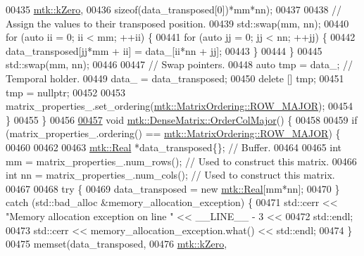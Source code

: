 \begin{DoxyCode}
00435           \hyperlink{group__c01-roots_ga59a451a5fae30d59649bcda274fea271}{mtk::kZero},
00436           \textcolor{keyword}{sizeof}(data\_transposed[0])*mm*nn);
00437 
00438     \textcolor{comment}{// Assign the values to their transposed position.}
00439     std::swap(mm, nn);
00440     \textcolor{keywordflow}{for} (\textcolor{keyword}{auto} ii = 0; ii < mm; ++ii) \{
00441       \textcolor{keywordflow}{for} (\textcolor{keyword}{auto} jj = 0; jj < nn; ++jj) \{
00442         data\_transposed[jj*mm + ii] = data\_[ii*nn + jj];
00443       \}
00444     \}
00445     std::swap(mm, nn);
00446 
00447     \textcolor{comment}{// Swap pointers.}
00448     \textcolor{keyword}{auto} tmp = data\_; \textcolor{comment}{// Temporal holder.}
00449     data\_ = data\_transposed;
00450     \textcolor{keyword}{delete} [] tmp;
00451     tmp = \textcolor{keyword}{nullptr};
00452 
00453     matrix\_properties\_.set\_ordering(\hyperlink{namespacemtk_ga622801bd9f912d0f976c3e383f5f581ca21541962976d7709c26e9cd8385bd648}{mtk::MatrixOrdering::ROW\_MAJOR});
00454   \}
00455 \}
00456 
\hypertarget{mtk__dense__matrix_8cc_source_l00457}{}\hyperlink{classmtk_1_1DenseMatrix_a59b9bea24acf39dca64e8549b3527463}{00457} \textcolor{keywordtype}{void} \hyperlink{classmtk_1_1DenseMatrix_a59b9bea24acf39dca64e8549b3527463}{mtk::DenseMatrix::OrderColMajor}() \{
00458 
00459   \textcolor{keywordflow}{if} (matrix\_properties\_.ordering() == \hyperlink{namespacemtk_ga622801bd9f912d0f976c3e383f5f581ca21541962976d7709c26e9cd8385bd648}{mtk::MatrixOrdering::ROW\_MAJOR}) \{
00460 
00462 
00463     \hyperlink{group__c01-roots_gac080bbbf5cbb5502c9f00405f894857d}{mtk::Real} *data\_transposed\{\}; \textcolor{comment}{// Buffer.}
00464 
00465     \textcolor{keywordtype}{int} mm = matrix\_properties\_.num\_rows(); \textcolor{comment}{// Used to construct this matrix.}
00466     \textcolor{keywordtype}{int} nn = matrix\_properties\_.num\_cols(); \textcolor{comment}{// Used to construct this matrix.}
00467 
00468     \textcolor{keywordflow}{try} \{
00469       data\_transposed = \textcolor{keyword}{new} \hyperlink{group__c01-roots_gac080bbbf5cbb5502c9f00405f894857d}{mtk::Real}[mm*nn];
00470     \} \textcolor{keywordflow}{catch} (std::bad\_alloc &memory\_allocation\_exception) \{
00471       std::cerr << \textcolor{stringliteral}{"Memory allocation exception on line "} << \_\_LINE\_\_ - 3 <<
00472         std::endl;
00473       std::cerr << memory\_allocation\_exception.what() << std::endl;
00474     \}
00475     memset(data\_transposed,
00476           \hyperlink{group__c01-roots_ga59a451a5fae30d59649bcda274fea271}{mtk::kZero},

\end{DoxyCode}

